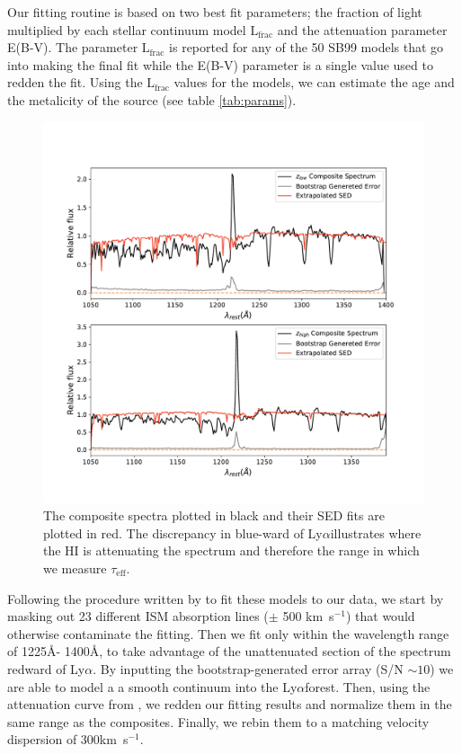 \documentclass[preprint2,times,tighten]{aastex6}
\newcommand{\teff}{$\tau_\mathrm{eff}$\space}
\newcommand{\lya}{Ly$\alpha$\space}
\newcommand{\kms}{km~s$^{-1}$\space}
\begin{document}
Our fitting routine is based on two best fit parameters; the fraction of light multiplied by each stellar continuum model $\mathrm{L_{frac}}$ and the attenuation parameter E(B-V). The parameter $\mathrm{L_{frac}}$ is reported for any of the 50 SB99 models that go into making the final fit while the E(B-V) parameter is a single value used to redden the fit. Using the $\mathrm{L_{frac}}$ values for the models, we can estimate the age and the metalicity of the source (see table \ref{tab:params}).

\begin{figure}[ht]
    \centering
    \includegraphics[scale = .5]{models.pdf}
    \caption{The composite spectra plotted in black and their SED fits are plotted in red. The discrepancy in blue-ward of \lya illustrates where the HI is attenuating the spectrum and therefore the range in which we measure \teff.}
    \label{fig:model}
\end{figure}

Following the procedure written by \cite{chisholm_constraining_2018} to fit these models to our data, we start by masking out 23 different ISM absorption lines ($\pm$ 500 \kms) that would otherwise contaminate the fitting. Then we fit only within the wavelength range of 1225\AA - 1400\AA, to take advantage of the unattenuated section of the spectrum redward of \lya. By inputting the bootstrap-generated error array (S/N $\sim 10$) we are able to model a a smooth continuum into the \lya forest. Then, using the attenuation curve from \cite{reddy_spectroscopic_2016}, we redden our fitting results and normalize them in the same range as the composites. Finally, we rebin them to a matching velocity dispersion of 300\kms. 
\end{document}
